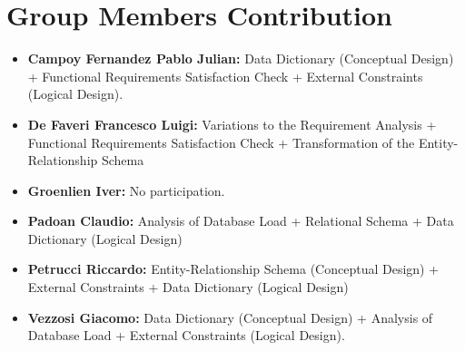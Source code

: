 \documentclass{article}
\begin{document}
\maketitle




\section{Group Members Contribution}

\begin{itemize}
    \item \textbf{Campoy Fernandez Pablo Julian:} Data Dictionary (Conceptual Design) + Functional Requirements Satisfaction Check + External Constraints (Logical Design).
    \item \textbf{De Faveri Francesco Luigi:} Variations to the Requirement Analysis + Functional Requirements Satisfaction Check + Transformation of the Entity-Relationship Schema
    \item \textbf{Groenlien Iver:} No participation.
    \item \textbf{Padoan Claudio:} Analysis of Database Load + Relational Schema + Data Dictionary (Logical Design)
    \item \textbf{Petrucci Riccardo:} Entity-Relationship Schema (Conceptual Design) + External Constraints + Data Dictionary (Logical Design)
    \item \textbf{Vezzosi Giacomo:} Data Dictionary (Conceptual Design) + Analysis of Database Load + External Constraints (Logical Design).
\end{itemize}
\end{document}
